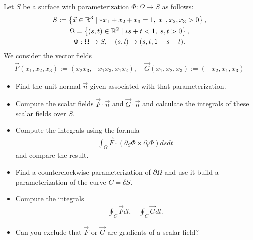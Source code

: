 \documentclass[11pt]{article}
\begin{document}
\begin{exercise} %
    Let $S$ be a surface with parameterization $\Phi : \Omega \to S$ as follows:
    \begin{gather}
     S := \left\{ \vec x \in \bbR^3 \suchthat* x_1 + x_2 + x_3 = 1, \; x_1, x_2, x_3 > 0 \right\},
     \\
     \Omega = \left\{ (s,t) \in \bbR^2 \suchthat* s + t < 1, \; s, t > 0 \right\},
     \\ 
     \Phi : \Omega \to S, \quad (s,t) \mapsto (s,t,1-s-t).
    \end{gather}
    We consider the vector fields 
    \begin{align}
        \vec F(x_1,x_2,x_3) := (x_2 x_3, -x_1 x_3, x_1 x_2), \quad \vec G(x_1,x_2,x_3) := (-x_2, x_1,x_3)
    \end{align}
    \begin{itemize}
    \item
     Find the unit normal $\vec n$ given associated with that parameterization.
    \item
     Compute the scalar fields $\vec F \cdot \vec n$ and $\vec G \cdot \vec n$ and calculate the integrals of these scalar fields over $S$.
    \item
     Compute the integrals using the formula 
     \begin{align}
        \int_\Omega \vec F \cdot ( \partial_S \Phi \times \partial_t \Phi ) dsdt
     \end{align}
     and compare the result. 
    \item 
     Find a counterclockwise parameterization of $\partial\Omega$ and use it build a parameterization of the curve $C = \partial S$.
    \item 
     Compute the integrals 
     \begin{align}
        \oint_C \vec F dl, \quad \oint_C \vec G dl.
     \end{align}
    \item 
     Can you exclude that $\vec F$ or $\vec G$ are gradients of a scalar field?
    \end{itemize}
\end{exercise}
\end{document}
